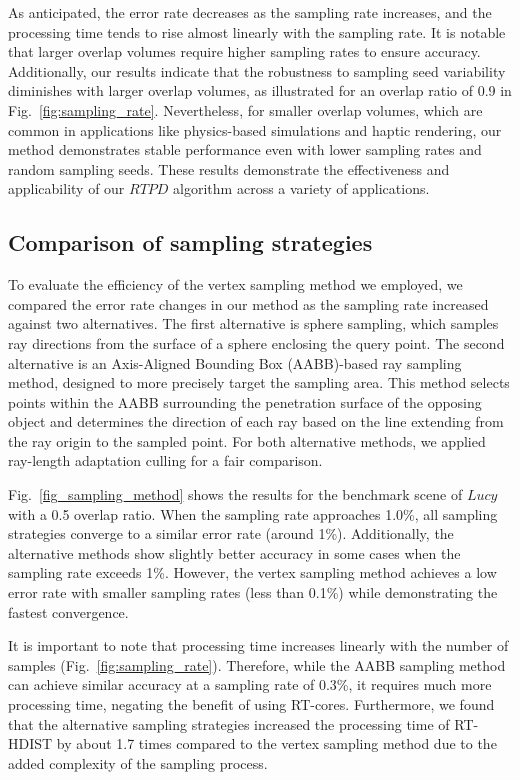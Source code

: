 As anticipated, the error rate decreases as the sampling rate increases, and the processing time tends to rise almost linearly with the sampling rate.
It is notable that larger overlap volumes require higher sampling rates to ensure accuracy.
Additionally, our results indicate that the robustness to sampling seed variability diminishes with larger overlap volumes, as illustrated for an overlap ratio of 0.9 in Fig.~\ref{fig:sampling_rate}.
Nevertheless, for smaller overlap volumes, which are common in applications like physics-based simulations and haptic rendering, our method demonstrates stable performance even with lower sampling rates and random sampling seeds.
These results demonstrate the effectiveness and applicability of our $RTPD$ algorithm across a variety of applications.


\subsection{Comparison of sampling strategies}

To evaluate the efficiency of the vertex sampling method we employed, we compared the error rate changes in our method as the sampling rate increased against two alternatives.
The first alternative is sphere sampling, which samples ray directions from the surface of a sphere enclosing the query point.
The second alternative is an Axis-Aligned Bounding Box (AABB)-based ray sampling method, designed to more precisely target the sampling area.
This method selects points within the AABB surrounding the penetration surface of the opposing object and determines the direction of each ray based on the line extending from the ray origin to the sampled point.
For both alternative methods, we applied ray-length adaptation culling for a fair comparison.

Fig.~\ref{fig_sampling_method} shows the results for the benchmark scene of $Lucy$ with a 0.5 overlap ratio.
When the sampling rate approaches 1.0\%, all sampling strategies converge to a similar error rate (around 1\%).
Additionally, the alternative methods show slightly better accuracy in some cases when the sampling rate exceeds 1\%.
However, the vertex sampling method achieves a low error rate with smaller sampling rates (less than 0.1\%) while demonstrating the fastest convergence.


It is important to note that processing time increases linearly with the number of samples (Fig.~\ref{fig:sampling_rate}).
Therefore, while the AABB sampling method can achieve similar accuracy at a sampling rate of 0.3\%, it requires much more processing time, negating the benefit of using RT-cores.
Furthermore, we found that the alternative sampling strategies increased the processing time of RT-HDIST by about 1.7 times compared to the vertex sampling method due to the added complexity of the sampling process.

